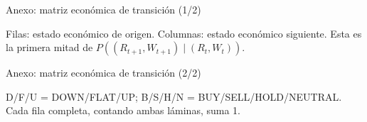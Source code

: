 \documentclass[10pt,aspectratio=169]{beamer}
\begin{document}
\begin{frame}{Anexo: matriz económica de transición (1/2)}
\centering
\scriptsize
\renewcommand{\arraystretch}{1.16}
\TablaMatrizTransicionesUno\par\vspace{.45em}
\footnotesize Filas: estado económico de origen. Columnas: estado económico siguiente. Esta es la primera mitad de $P((R_{t+1},W_{t+1})\mid(R_t,W_t))$.
\end{frame}

\begin{frame}{Anexo: matriz económica de transición (2/2)}
\centering
\scriptsize
\renewcommand{\arraystretch}{1.16}
\TablaMatrizTransicionesDos\par\vspace{.45em}
\footnotesize D/F/U = DOWN/FLAT/UP; B/S/H/N = BUY/SELL/HOLD/NEUTRAL. Cada fila completa, contando ambas láminas, suma 1.
\end{frame}
\end{document}
